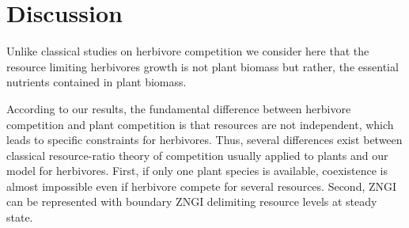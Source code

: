 \documentclass[12pt]{article}
\begin{document}
\section*{Discussion}

Unlike classical studies on herbivore competition we consider here that the resource limiting herbivores growth is not plant biomass but rather, the essential nutrients contained in plant biomass. 

According to our results, the fundamental difference between herbivore competition and plant competition  is that resources 
 are not independent,  
which leads to specific constraints for herbivores. Thus, several differences exist between classical resource-ratio theory of competition usually applied to plants \citep{Tilman1980} and our model for herbivores. 
First, if  only one plant species is available, coexistence is almost impossible even if herbivore compete for several resources. Second, 
ZNGI can be represented with boundary ZNGI delimiting resource levels at steady state. 
\end{document}
